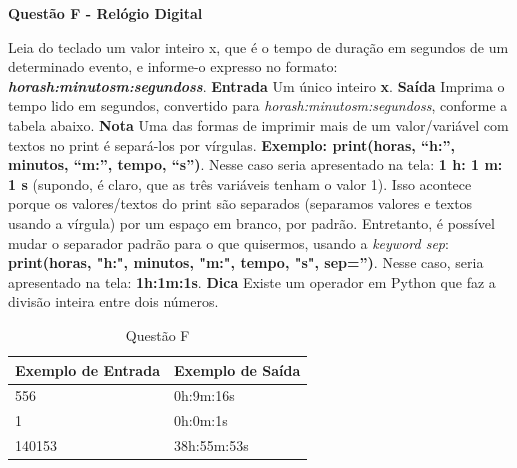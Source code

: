 \documentclass[a4paper, 12pt]{article}
\begin{document}
\newpage %
\begin{center}
\textbf{{\Large Questão F - Relógio Digital}}
\end{center}
\vspace{5pt}
Leia do teclado um valor inteiro x, que é o tempo de duração em segundos de um determinado evento, e informe-o expresso no formato: \textbf{\textit{horash:minutosm:segundoss}}.
\newline \newline
\textbf{{\large Entrada}} \newline
Um único inteiro \textbf{x}.
\newline \newline
\textbf{{\large Saída}} \newline
Imprima o tempo lido em segundos, convertido para \textit{horash:minutosm:segundoss}, conforme 
a tabela abaixo.
\newline \newline
\textbf{{\large Nota}} \newline
Uma das formas de imprimir mais de um valor/variável com textos no print é separá-los por vírgulas. \newline
\textbf{Exemplo: print(horas, “h:”, minutos, “m:”, tempo, “s”)}. Nesse caso seria apresentado na tela: 
\textbf{1 h: 1 m: 1 s} (supondo, é claro, que as três variáveis tenham o valor 1). Isso acontece porque os valores/textos do print são separados (separamos valores e textos usando a vírgula) por um espaço em branco, por padrão. Entretanto, é possível mudar o separador padrão para o que quisermos, usando a \textit{keyword sep}: \newline
\textbf{print(horas, "h:", minutos, "m:", tempo, "s", sep='')}. Nesse caso, seria apresentado na tela: \textbf{1h:1m:1s}.
\newline \newline
\textbf{{\large Dica}} \newline
Existe um operador em Python que faz a divisão inteira entre dois números.
\newline
\begin{table}[H]
	\centering
	\begin{tabular}{|l|l|}
	\hline
	\textbf{Exemplo de Entrada} & \textbf{Exemplo de Saída} \\ \hline
	556 & 0h:9m:16s \\ \hline
	1 & 0h:0m:1s \\ \hline
	140153 & 38h:55m:53s \\ \hline
	\end{tabular}
	\caption{Questão F}
	\label{tabela6}
\end{table}
\end{document}
